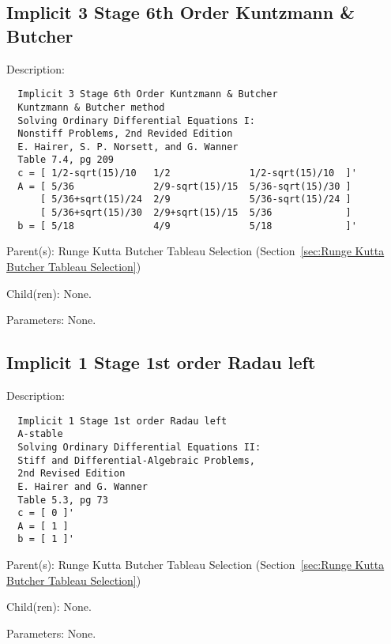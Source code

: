 \subsection{Implicit 3 Stage 6th Order Kuntzmann \& Butcher}
\label{sec:Implicit 3 Stage 6th Order Kuntzmann and Butcher}

\begin{list}{}
  {\setlength{\leftmargin}{1.0in}
   \setlength{\labelwidth}{0.75in}
   \setlength{\labelsep}{0.125in}}
  \item[Description:]
\begin{verbatim}
  Implicit 3 Stage 6th Order Kuntzmann & Butcher
  Kuntzmann & Butcher method
  Solving Ordinary Differential Equations I:
  Nonstiff Problems, 2nd Revided Edition
  E. Hairer, S. P. Norsett, and G. Wanner
  Table 7.4, pg 209
  c = [ 1/2-sqrt(15)/10   1/2              1/2-sqrt(15)/10  ]'
  A = [ 5/36              2/9-sqrt(15)/15  5/36-sqrt(15)/30 ]
      [ 5/36+sqrt(15)/24  2/9              5/36-sqrt(15)/24 ]
      [ 5/36+sqrt(15)/30  2/9+sqrt(15)/15  5/36             ]
  b = [ 5/18              4/9              5/18             ]'
\end{verbatim}
  \item[Parent(s):]
    Runge Kutta Butcher Tableau Selection (Section~\ref{sec:Runge Kutta Butcher Tableau Selection})
  \item[Child(ren):]
    None. 
  \item[Parameters:]
    None. 
\end{list}

\subsection{Implicit 1 Stage 1st order Radau left}
\label{sec:Implicit 1 Stage 1st order Radau left}

\begin{list}{}
  {\setlength{\leftmargin}{1.0in}
   \setlength{\labelwidth}{0.75in}
   \setlength{\labelsep}{0.125in}}
  \item[Description:]
\begin{verbatim}
  Implicit 1 Stage 1st order Radau left
  A-stable
  Solving Ordinary Differential Equations II:
  Stiff and Differential-Algebraic Problems,
  2nd Revised Edition
  E. Hairer and G. Wanner
  Table 5.3, pg 73
  c = [ 0 ]'
  A = [ 1 ]
  b = [ 1 ]'
\end{verbatim}
  \item[Parent(s):]
    Runge Kutta Butcher Tableau Selection (Section~\ref{sec:Runge Kutta Butcher Tableau Selection})
  \item[Child(ren):]
    None. 
  \item[Parameters:]
    None. 
\end{list}

